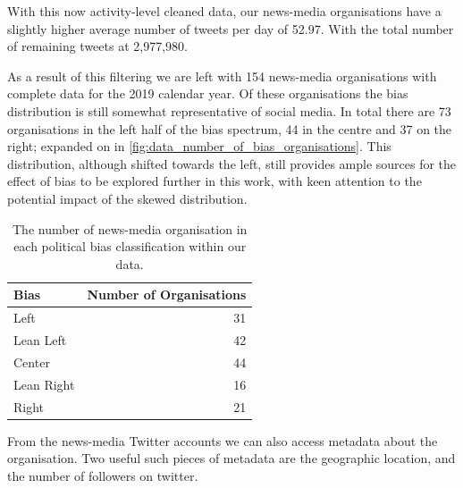 With this now activity-level cleaned data, our news-media organisations have a slightly higher average number of tweets per day of 52.97. With the total number of remaining tweets at 2,977,980.


As a result of this filtering we are left with 154 news-media organisations with complete data for the 2019 calendar year. Of these organisations the bias distribution is still somewhat representative of social media.  In total there are 73 organisations in the left half of the bias spectrum, 44 in the centre and 37 on the right; expanded on in \autoref{fig:data_number_of_bias_organisations}. This distribution, although shifted towards the left, still provides ample sources for the effect of bias to be explored further in this work, with keen attention to the potential impact of the skewed distribution. 

\begin{table}[h]
	\begin{tabular}{lr}
		\toprule
		Bias &   Number of Organisations \\
		\midrule
		{\color{Left} Left }&  31 \\
		{\color{LeanLeft} Lean Left }&  42 \\
		{\color{Center} Center }&  44 \\
		{\color{LeanRight} Lean Right }&  16 \\
		{\color{Right} Right }&  21 \\
		\bottomrule
	\end{tabular}
	\caption{The number of news-media organisation in each political bias classification within our data.}
	\label{fig:data_number_of_bias_organisations}
\end{table}


From the news-media Twitter accounts we can also access metadata about the organisation. Two useful such pieces of metadata are the geographic location, and the number of followers on twitter.


